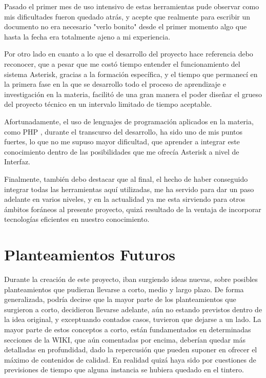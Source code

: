 Pasado el primer mes de uso intensivo de estas herramientas pude observar como mis dificultades fueron quedado atrás, y acepte que realmente para escribir un documento no era necesario "verlo bonito" desde el primer momento algo que hasta la fecha era totalmente ajeno a mi experiencia.

Por otro lado en cuanto a lo que el desarrollo del proyecto hace referencia debo reconocer, que a pesar que me costó tiempo entender el funcionamiento del sistema Asterisk, gracias a la formación específica, y el tiempo que permanecí en la primera fase en la que se desarrollo todo el proceso de aprendizaje e investigación en la materia, facilitó de una gran manera el poder diseñar el grueso del proyecto técnico en un intervalo limitado de tiempo aceptable.

Afortunadamente, el uso de lenguajes de programación aplicados en la materia, como PHP \cite{website:php} \cite{gilmore10}, durante el transcurso del desarrollo, ha sido uno de mis puntos fuertes, lo que no me supuso mayor dificultad, que aprender a integrar este conocimiento dentro de las posibilidades que me ofrecía Asterisk a nivel de Interfaz.

Finalmente, también debo destacar que al final, el hecho de haber conseguido integrar todas las herramientas aquí utilizadas, me ha servido para dar un paso adelante en varios niveles, y en la actualidad ya me esta sirviendo para otros ámbitos foráneos al presente proyecto, quizá resultado de la ventaja de incorporar tecnologías eficientes en nuestro conocimiento.

\section{Planteamientos Futuros}

Durante la creación de este proyecto, iban surgiendo ideas nuevas, sobre posibles planteamientos que pudieran llevarse a corto, medio y largo plazo. De forma generalizada, podría decirse que la mayor parte de los planteamientos que surgieron a corto, decidieron llevarse adelante, aún no estando previstos dentro de la idea original, y exceptuando contados casos, tuvieron que dejarse a un lado. La mayor parte de estos conceptos a corto, están fundamentados en determinadas secciones de la WIKI, que aún comentadas por encima, deberían quedar más detalladas en profundidad, dado la repercusión que pueden suponer en ofrecer el máximo de contenidos de calidad. En realidad quizá haya sido por cuestiones de previsiones de tiempo que alguna instancia se hubiera quedado en el tintero.


